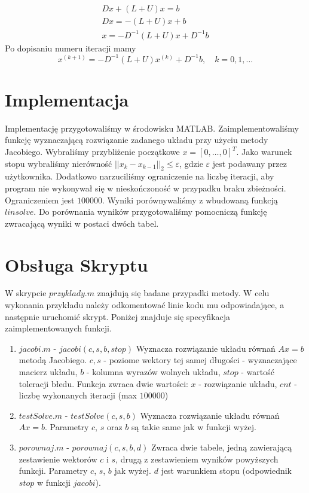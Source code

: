 \documentclass{article}
\begin{document}
	\begin{gather*}
	Dx + (L + U)x = b \\
	Dx = -(L + U)x + b \\
	x = -D^{-1}(L + U)x + D^{-1}b
	\end{gather*}
	Po dopisaniu numeru iteracji mamy
	\[
	x^{(k+1)} = -D^{-1}(L + U)x^{(k)} + D^{-1}b,
	\quad k = 0, 1, \ldots
	\]
	
	\section{Implementacja}
	Implementację przygotowaliśmy w środowisku MATLAB. Zaimplementowaliśmy funkcję wyznaczającą rozwiązanie zadanego układu przy użyciu metody Jacobiego. Wybraliśmy przybliżenie początkowe $x = [0, \ldots, 0]^T$. Jako warunek stopu wybraliśmy nierówność $||x_k - x_{k-1}||_2 \le \varepsilon$, gdzie $\varepsilon$ jest podawany przez użytkownika. Dodatkowo narzuciliśmy ograniczenie na liczbę iteracji, aby program nie wykonywał się w nieskończoność w przypadku braku zbieżności. Ograniczeniem jest $100000$. Wyniki porównywaliśmy z wbudowaną funkcją $linsolve$. Do porównania wyników przygotowaliśmy pomocniczą funkcję zwracającą wyniki w postaci dwóch tabel.
	
	\section{Obsługa Skryptu}
	W skrypcie $przyklady.m$ znajdują się badane przypadki metody. W celu wykonania przykładu należy odkomentować linie kodu mu odpowiadające, a następnie uruchomić skrypt. Poniżej znajduje się specyfikacja zaimplementowanych funkcji.
	
	\begin{enumerate}
	\item $jacobi.m$ - $jacobi(c, s, b, stop)$ Wyznacza rozwiązanie układu równań $Ax = b$ metodą Jacobiego. $c, s$ - poziome wektory tej samej długości - wyznaczające macierz układu, $b$ - kolumna	wyrazów wolnych układu, $stop$ - wartość toleracji błedu. Funkcja zwraca dwie wartości: $x$ - rozwiązanie układu,
	$cnt$ - liczbę wykonanych iteracji (max $100000$)
	
	\item $testSolve.m$ - $testSolve(c, s, b)$ Wyznacza rozwiązanie układu równań $Ax = b$. Parametry $c$, $s$ oraz $b$ są takie same jak w funkcji wyżej.
	
	\item $porownaj.m$ - $porownaj(c, s, b, d)$ Zwraca dwie tabele, jedną zawierającą zestawienie wektorów $c$ i $s$, drugą z zestawieniem wyników powyższych funkcji. Parametry $c$, $s$, $b$ jak wyżej. $d$ jest warunkiem stopu (odpowiednik $stop$ w funkcji $jacobi$).
	\end{enumerate}
		
\end{document}
